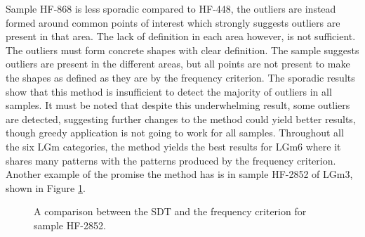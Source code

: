 Sample HF-868 is less sporadic compared to HF-448, the outliers are instead formed around common points of interest which strongly suggests outliers are present in that area. The lack of definition in each area however, is not sufficient. The outliers must form concrete shapes with clear definition. The sample suggests outliers are present in the different areas, but all points are not present to make the shapes as defined as they are by the frequency criterion. 
The sporadic results show that this method is insufficient to detect the majority of outliers in all samples. It must be noted that despite this underwhelming result, some outliers are detected, suggesting further changes to the method could yield better results, though greedy application is not going to work for all samples. Throughout all the six LGm categories, the method yields the best results for LGm6 where it shares many patterns with the patterns produced by the frequency criterion. Another example of the promise the method has is in sample HF-2852 of LGm3, shown in Figure \ref{fig:stdHF2852}.

\begin{figure}[H]
    \centering
    \qquad
    \caption{A comparison between the SDT and the frequency criterion for sample HF-2852.
\label{fig:stdHF2852}}%
\end{figure}


